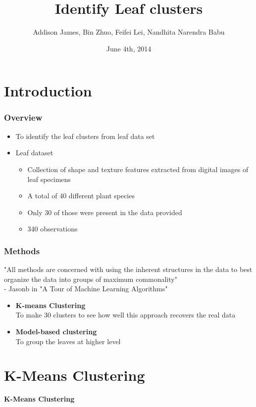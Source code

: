\documentclass{beamer}
\title{Identify Leaf clusters}
\author{Addison James, Bin Zhuo, Feifei Lei, Nandhita Narendra Babu}
\date{June 4th, 2014}
\begin{document}
\begin{frame}
\titlepage
\end{frame}

\begin{frame}{\contentsname}
\tableofcontents
\end{frame}

\section{Introduction}

\begin{frame}
\frametitle{Overview}
\begin{itemize}
\item To identify the leaf clusters from leaf data set

\item Leaf dataset
\begin{itemize}
\item Collection of shape and texture features extracted from digital images of leaf specimens 
\item A total of 40 different plant species
\item Only 30 of those were present in the data provided
\item 340 observations
\end{itemize}
\end{itemize}
\end{frame}


\begin{frame}
\frametitle{Methods}
"All methods are concerned with using the inherent structures in the data to best organize the data into groups of maximum commonality" 
\\ - Jasonb in "A Tour of Machine Learning Algorithms" \\
\begin{itemize}
\item \textbf{K-means Clustering}  \\ 
To make 30 clusters to see how well this approach recovers the real data
\item \textbf{Model-based clustering}  \\
To group the leaves at higher level 
\end{itemize}
\end{frame}





\section{K-Means Clustering}
\begin{frame}
\begin{center}
\textbf{K-Means Clustering}
\end{center} 
\end{frame}
\end{document}
